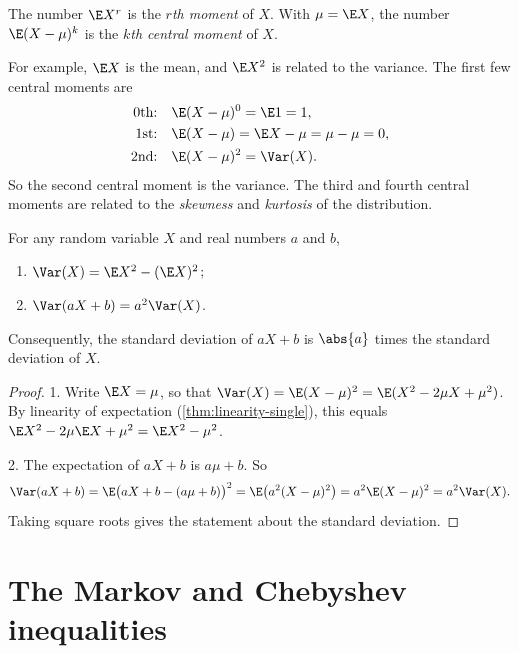 \begin{definition}[Moments]\label{def:moments}
The number $\E X^r$ is the \emph{$r$th moment} of $X$. With $\mu = \E X$, the number $\E(X - \mu)^k$ is the \emph{$k$th central moment} of $X$.
\end{definition}

For example, $\E X$ is the mean, and $\E X^2$ is related to the variance. The first few central moments are
\begin{align*}
  \text{0th:} \quad & \E(X - \mu)^0 = \E 1 = 1, \\
  \text{1st:} \quad & \E(X - \mu) = \E X - \mu = \mu - \mu = 0, \\
  \text{2nd:} \quad & \E(X - \mu)^2 = \Var(X).
\end{align*}
So the second central moment is the variance. The third and fourth central moments are related to the \emph{skewness} and \emph{kurtosis} of the distribution.

\begin{theorem}\label{thm:variance-properties}
For any random variable $X$ and real numbers $a$ and $b$,
\begin{enumerate}
  \item $\Var(X) = \E X^2 - (\E X)^2$;
  \item $\Var(aX + b) = a^2 \Var(X)$.
\end{enumerate}
Consequently, the standard deviation of $aX + b$ is $\abs{a}$ times the standard deviation of $X$.
\end{theorem}

\begin{proof}
1. Write $\E X = \mu$, so that $\Var(X) = \E(X - \mu)^2 = \E(X^2 - 2\mu X + \mu^2)$. By linearity of expectation (\cref{thm:linearity-single}), this equals $\E X^2 - 2\mu \E X + \mu^2 = \E X^2 - \mu^2$.

2. The expectation of $aX + b$ is $a\mu + b$. So
\[
  \Var(aX + b) = \E\bigl(aX + b - (a\mu + b)\bigr)^2 = \E\bigl(a^2 (X - \mu)^2\bigr) = a^2 \E(X - \mu)^2 = a^2 \Var(X).
\]
Taking square roots gives the statement about the standard deviation.
\end{proof}

\section{The Markov and Chebyshev inequalities}\label{sec:markov-chebyshev}

